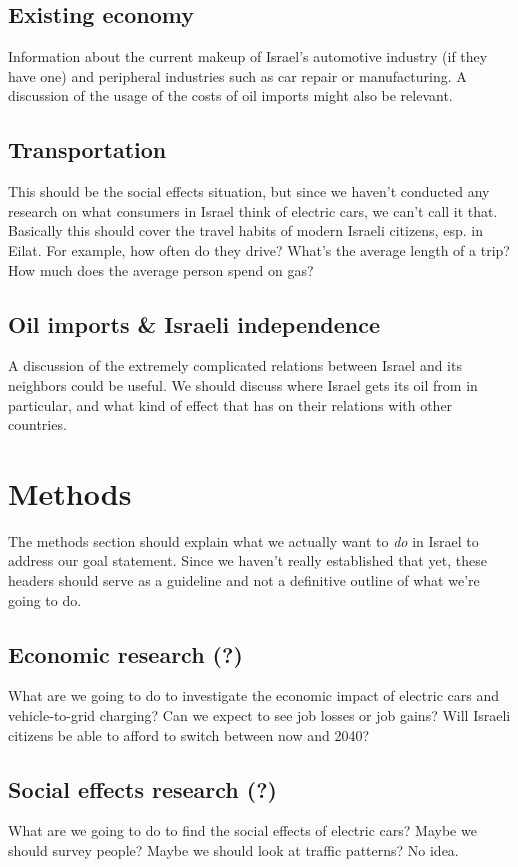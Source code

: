 \documentclass{article}                         %
\begin{document}
\subsection{Existing economy}
Information about the current makeup of Israel's automotive industry (if they have one) and peripheral industries such as car repair or manufacturing. A discussion of the usage of the costs of oil imports might also be relevant.

\subsection{Transportation}
This should be the social effects situation, but since we haven't conducted any research on what consumers in Israel think of electric cars, we can't call it that. Basically this should cover the travel habits of modern Israeli citizens, esp. in Eilat. For example, how often do they drive? What's the average length of a trip? How much does the average person spend on gas?

\subsection{Oil imports \& Israeli independence}

A discussion of the extremely complicated relations between Israel and its neighbors could be useful. We should discuss where Israel gets its oil from in particular, and what kind of effect that has on their relations with other countries.

\newpage
\section{Methods}
The methods section should explain what we actually want to \textit{do} in Israel to address our goal statement. Since we haven't really established that yet, these headers should serve as a guideline and not a definitive outline of what we're going to do.

\subsection{Economic research (?)}
What are we going to do to investigate the economic impact of electric cars and vehicle-to-grid charging? Can we expect to see job losses or job gains? Will Israeli citizens be able to afford to switch between now and 2040?

\subsection{Social effects research (?)}
What are we going to do to find the social effects of electric cars? Maybe we should survey people? Maybe we should look at traffic patterns? No idea.
\end{document}

